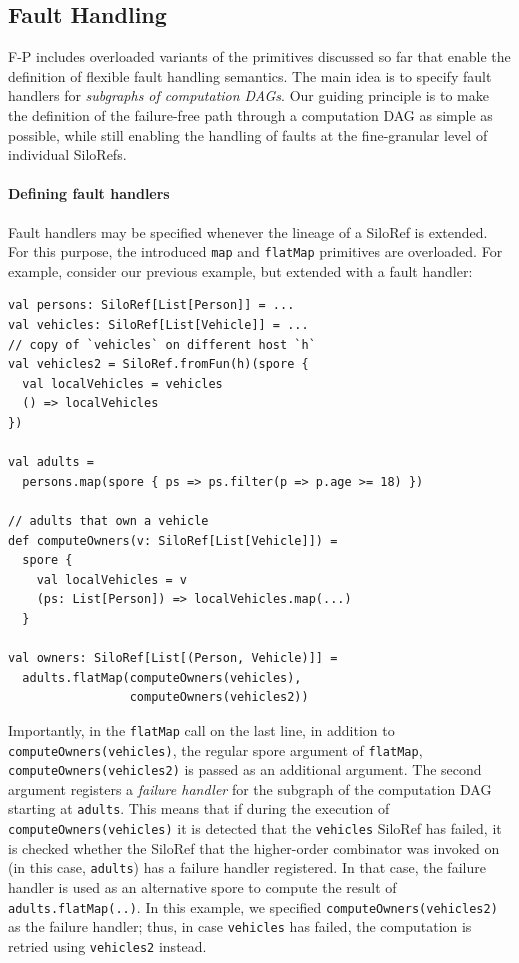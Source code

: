 \documentclass[preprint]{sigplanconf}
\theoremstyle{definition}
\theoremstyle{definition}
\begin{document}
\subsection{Fault Handling}
\label{sec:fault-handling}

F-P includes overloaded variants of the primitives discussed so far that
enable the definition of flexible fault handling semantics. The main idea is
to specify fault handlers for \emph{subgraphs of computation DAGs}. Our
guiding principle is to make the definition of the failure-free path through a
computation DAG as simple as possible, while still enabling the handling of
faults at the fine-granular level of individual SiloRefs.

\paragraph{Defining fault handlers} Fault handlers may be specified whenever
the lineage of a SiloRef is extended. For this purpose, the introduced
\verb|map| and \verb|flatMap| primitives are overloaded. For example,
consider our previous example, but extended with a fault handler:

\begin{lstlisting}
val persons: SiloRef[List[Person]] = ...
val vehicles: SiloRef[List[Vehicle]] = ...
// copy of `vehicles` on different host `h`
val vehicles2 = SiloRef.fromFun(h)(spore {
  val localVehicles = vehicles
  () => localVehicles
})

val adults =
  persons.map(spore { ps => ps.filter(p => p.age >= 18) })

// adults that own a vehicle
def computeOwners(v: SiloRef[List[Vehicle]]) =
  spore {
    val localVehicles = v
    (ps: List[Person]) => localVehicles.map(...)
  }

val owners: SiloRef[List[(Person, Vehicle)]] =
  adults.flatMap(computeOwners(vehicles),
                 computeOwners(vehicles2))
\end{lstlisting}

Importantly, in the \verb|flatMap| call on the last line, in addition to
\verb|computeOwners(vehicles)|, the regular spore argument of \verb|flatMap|,
\verb|computeOwners(vehicles2)| is passed as an additional argument. The
second argument registers a \emph{failure handler} for the subgraph of the
computation DAG starting at \verb|adults|. This means that if during the
execution of \verb|computeOwners(vehicles)| it is detected that the
\verb|vehicles| SiloRef has failed, it is checked whether the SiloRef that the
higher-order combinator was invoked on (in this case, \verb|adults|) has a
failure handler registered. In that case, the failure handler is used as an
alternative spore to compute the result of \verb|adults.flatMap(..)|. In this
example, we specified \verb|computeOwners(vehicles2)| as the failure handler;
thus, in case \verb|vehicles| has failed, the computation is retried using
\verb|vehicles2| instead.
\end{document}
